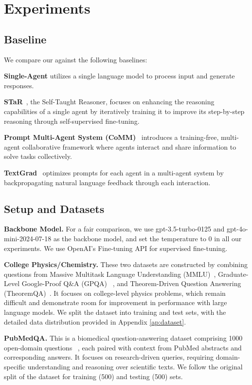 \section{Experiments}
\subsection{Baseline}

We compare our \model{} against the following baselines:

\textbf{Single-Agent} utilizes a single language model to process input and generate responses.

\textbf{STaR}~\citep{zelikman2022star}, the Self-Taught Reasoner, focuses on enhancing the reasoning capabilities of a single agent by iteratively training it to improve its step-by-step reasoning through self-supervised fine-tuning. 

\textbf{Prompt Multi-Agent System (CoMM)}~\citep{chen2024comm} introduces a training-free, multi-agent collaborative framework where agents interact and share information to solve tasks collectively. 

\textbf{TextGrad}~\citep{yuksekgonul2024textgrad} optimizes prompts for each agent in a multi-agent system by backpropagating natural language feedback through each interaction.



\subsection{Setup and Datasets}
\textbf{Backbone Model.}
For a fair comparison, we use gpt-3.5-turbo-0125 and gpt-4o-mini-2024-07-18 as the backbone model, and set the temperature to 0 in all our experiments. We use OpenAI's Fine-tuning API for supervised fine-tuning.

\textbf{College Physics/Chemistry.}
These two datasets are constructed by combining questions from Massive Multitask Language Understanding (MMLU)~\citep{hendrycks2020measuring}, Graduate-Level Google-Proof Q\&A (GPQA) ~\citep{rein2023gpqa}, and Theorem-Driven Question Answering (TheoremQA)~\citep{chen2023theoremqa}. It focuses on college-level physics problems, which remain difficult and demonstrate room for improvement in performance with large language models.
We split the dataset into training and test sets, with the detailed data distribution provided in Appendix \ref{ap:dataset}.

\textbf{PubMedQA.}
This is a biomedical question-answering dataset comprising 1000 open-domain questions ~\citep{jin2019pubmedqa}, each paired with context from PubMed abstracts and corresponding answers. It focuses on research-driven queries, requiring domain-specific understanding and reasoning over scientific texts. We follow the original split of the dataset for training (500) and testing (500) sets.

